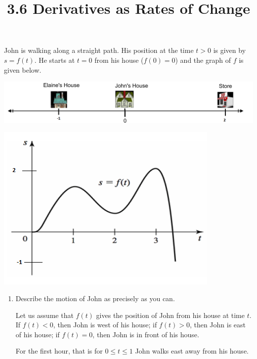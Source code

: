 \documentclass[nooutcomes]{ximera}
\title{3.6 Derivatives as Rates of Change}
\begin{document}
\begin{abstract}		\end{abstract}
\maketitle


\begin{problem}
John is walking along a straight path.  His position at the time $t>0$ is given by $s=f(t)$.  He starts at $t=0$ from his house ($f(0)=0$) and the graph of $f$ is given below.


	\begin{image}
	\includegraphics[scale=.4]{Figure13.png}
	\end{image}

	\begin{image}
	\includegraphics{Figure2a.png}
	\end{image}
	
	\begin{enumerate}
	
	\item  Describe the motion of John as precisely as you can.
		\begin{freeResponse}
		Let us assume that $f(t)$ gives the position of John from his house at time $t$.  If $f(t) < 0$, then John is west of his house;  if $f(t) > 0$, then John is east of his house; if $f(t)=0$, then John is in front of his house.  
		
		For the first hour, that is for $0 \leq t \leq 1$ John walks east away from his house.
		

\end{freeResponse}
\end{enumerate}
\end{problem}
\end{document}

